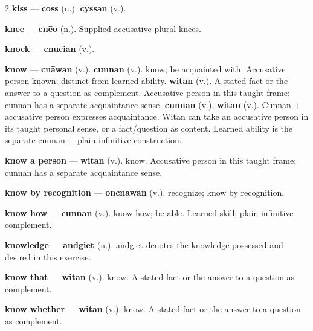 \begin{multicols}{2}
\textbf{kiss} — \textbf{coss} (n.).  \textbf{cyssan} (v.).\par
\textbf{knee} — \textbf{cnēo} (n.). Supplied accusative plural knees.\par
\textbf{knock} — \textbf{cnucian} (v.).\par
\textbf{know} — \textbf{cnāwan} (v.).  \textbf{cunnan} (v.). know; be acquainted with. Accusative person known; distinct from learned ability. \textbf{witan} (v.). A stated fact or the answer to a question as complement. Accusative person in this taught frame; cunnan has a separate acquaintance sense. \textbf{cunnan} (v.), \textbf{witan} (v.). Cunnan + accusative person expresses acquaintance. Witan can take an accusative person in its taught personal sense, or a fact/question as content. Learned ability is the separate cunnan + plain infinitive construction.\par
\textbf{know a person} — \textbf{witan} (v.). know. Accusative person in this taught frame; cunnan has a separate acquaintance sense.\par
\textbf{know by recognition} — \textbf{oncnāwan} (v.). recognize; know by recognition.\par
\textbf{know how} — \textbf{cunnan} (v.). know how; be able. Learned skill; plain infinitive complement.\par
\textbf{knowledge} — \textbf{andgiet} (n.). andgiet denotes the knowledge possessed and desired in this exercise.\par
\textbf{know that} — \textbf{witan} (v.). know. A stated fact or the answer to a question as complement.\par
\textbf{know whether} — \textbf{witan} (v.). know. A stated fact or the answer to a question as complement.\par

\end{multicols}
